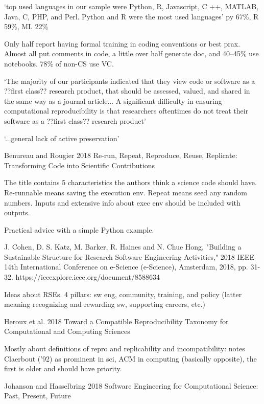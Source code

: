 \documentclass[12pt]{amsart}
\begin{document}
`top used languages in our sample were Python, R, Javascript, C ++, MATLAB, Java, C, PHP, and Perl. Python and R were the most used languages' py 67\%, R 59\%, ML 22\%

Only half report having formal training in coding conventions or best prax. Almost all put comments in code, a little over half generate doc, and 40--45\% use notebooks. 78\% of non-CS use VC.

`The majority of our participants indicated that they view code or software as a ??first class?? research product, that should be assessed, valued, and shared in the same way as
a journal article... A significant difficulty in ensuring computational reproducibility is that researchers oftentimes do not treat their software as a ??first class?? research product'

`...general lack of active preservation'




Benureau and Rougier 2018 
Re-run, Repeat, Reproduce, Reuse, Replicate: Transforming Code into Scientific Contributions

The title contains 5 characteristics the authors think a science code should have. Re-runnable means saving the execution env. Repeat means seed any random numbers. Inputs and extensive info about exec env should be included with outputs.

Practical advice with a simple Python example.



J. Cohen, D. S. Katz, M. Barker, R. Haines and N. Chue Hong, "Building a Sustainable Structure for Research Software Engineering Activities," 2018 IEEE 14th International Conference on e-Science (e-Science), Amsterdam, 2018, pp. 31-32.
https://ieeexplore.ieee.org/document/8588634

Ideas about RSEs. 4 pillars: sw eng, community, training, and policy (latter meaning recognizing and rewarding sw, supporting careers, etc.)




Heroux et al. 2018 Toward a Compatible Reproducibility Taxonomy for Computational and Computing Sciences

Mostly about definitions of repro and replicability and incompatibility: notes Claerbout ('92) as prominent in sci, ACM in computing (basically opposite), the first is older and should have priority.



Johanson and Hasselbring 2018 Software Engineering for Computational Science: Past, Present, Future
\end{document}
